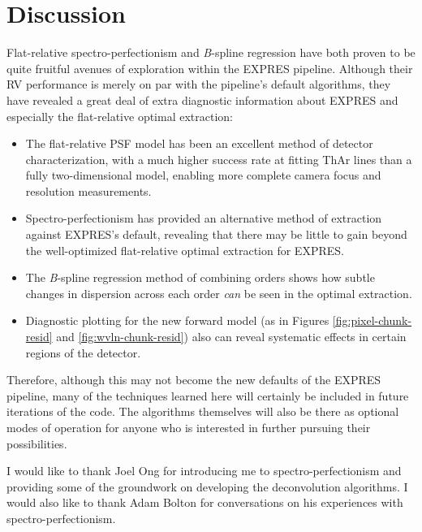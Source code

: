 \section{Discussion} \label{pipeline2:discussion}

Flat-relative spectro-perfectionism and \textit{B}-spline regression have both proven to be quite fruitful avenues of exploration within the EXPRES pipeline. Although their RV performance is merely on par with the pipeline's default algorithms, they have revealed a great deal of extra diagnostic information about EXPRES and especially the flat-relative optimal extraction:
\begin{itemize}
    \item The flat-relative PSF model has been an excellent method of detector characterization, with a much higher success rate at fitting ThAr lines than a fully two-dimensional model, enabling more complete camera focus and resolution measurements.
    \item Spectro-perfectionism has provided an alternative method of extraction against EXPRES's default, revealing that there may be little to gain beyond the well-optimized flat-relative optimal extraction for EXPRES.
    \item The \textit{B}-spline regression method of combining orders shows how subtle changes in dispersion across each order \textit{can} be seen in the optimal extraction.
    \item Diagnostic plotting for the new forward model (as in Figures \ref{fig:pixel-chunk-resid} and \ref{fig:wvln-chunk-resid}) also can reveal systematic effects in certain regions of the detector.
\end{itemize}
Therefore, although this may not become the new defaults of the EXPRES pipeline, many of the techniques learned here will certainly be included in future iterations of the code. The algorithms themselves will also be there as optional modes of operation for anyone who is interested in further pursuing their possibilities.

I would like to thank Joel Ong for introducing me to spectro-perfectionism and providing some of the groundwork on developing the deconvolution algorithms. I would also like to thank Adam Bolton for conversations on his experiences with spectro-perfectionism.